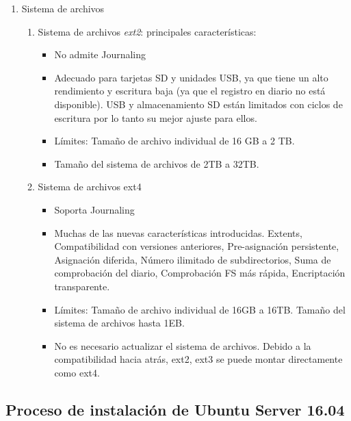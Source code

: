 \documentclass[
]{book}
\providecommand{\tightlist}{%
  \setlength{\itemsep}{0pt}\setlength{\parskip}{0pt}}
\begin{document}
\begin{enumerate}
\def\labelenumi{\arabic{enumi}.}
\setcounter{enumi}{4}
\tightlist
\item
  Sistema de archivos

  \begin{enumerate}
  \def\labelenumii{\alph{enumii}.}
  \tightlist
  \item
    Sistema de archivos \emph{ext2}: principales características:

    \begin{itemize}
    \tightlist
    \item
      No admite Journaling
    \item
      Adecuado para tarjetas SD y unidades USB, ya que tiene un alto rendimiento y escritura baja (ya que el registro en diario no está disponible). USB y almacenamiento SD están limitados con ciclos de escritura por lo tanto su mejor ajuste para ellos.
    \item
      Límites: Tamaño de archivo individual de 16 GB a 2 TB.
    \item
      Tamaño del sistema de archivos de 2TB a 32TB.
    \end{itemize}
  \item
    Sistema de archivos ext4

    \begin{itemize}
    \tightlist
    \item
      Soporta Journaling
    \item
      Muchas de las nuevas características introducidas. Extents, Compatibilidad con versiones anteriores, Pre-asignación persistente, Asignación diferida, Número ilimitado de subdirectorios, Suma de comprobación del diario, Comprobación FS más rápida, Encriptación transparente.
    \item
      Límites: Tamaño de archivo individual de 16GB a 16TB. Tamaño del sistema de archivos hasta 1EB.
    \item
      No es necesario actualizar el sistema de archivos. Debido a la compatibilidad hacia atrás, ext2, ext3 se puede montar directamente como ext4.
    \end{itemize}
  \end{enumerate}
\end{enumerate}

\hypertarget{proceso-de-instalaciuxf3n-de-ubuntu-server-16.04}{%
\subsection{Proceso de instalación de Ubuntu Server 16.04}\label{proceso-de-instalaciuxf3n-de-ubuntu-server-16.04}}
\end{document}
